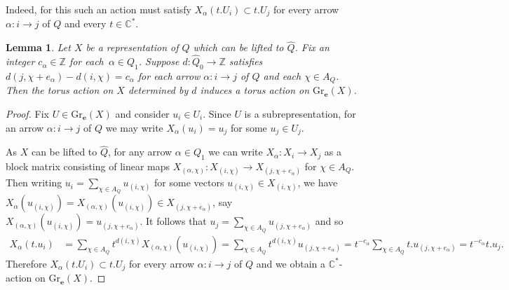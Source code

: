\documentclass{amsart}
\newtheorem{lemma}[theorem]{Lemma}
\numberwithin{equation}{section}
\newcommand{\CC}{\mathbb{C}}
\newcommand{\ZZ}{\mathbb{Z}}
\newcommand{\bfe}{\mathbf{e}}
\newcommand{\Gr}{\mathrm{Gr}}
\begin{document}
Indeed, for this such an action must satisfy $X_\alpha(t.U_i)\subset t.U_j$ for every arrow $\alpha:i\to j$ of $Q$ and every $t\in\CC^*$. 
\begin{lemma}
  Let $X$ be a representation of $Q$ which can be lifted to $\hat Q$.
  Fix an integer $c_\alpha\in\ZZ$ for each~$\alpha\in Q_1$.
  Suppose $d:\hat Q_0\to\ZZ$ satisfies $d(j,\chi+e_\alpha)-d(i,\chi)=c_\alpha$ for each arrow $\alpha:i\to j$ of $Q$ and each $\chi\in A_Q$.
  Then the torus action on $X$ determined by $d$ induces a torus action on $\Gr_\bfe(X)$.
\end{lemma}
\begin{proof} 
  Fix $U\in\Gr_\bfe(X)$ and consider $u_i\in U_i$.
  Since $U$ is a subrepresentation, for an arrow $\alpha:i\to j$ of $Q$ we may write $X_\alpha(u_i)=u_j$ for some $u_j\in U_j$.

  As $X$ can be lifted to $\hat Q$, for any arrow $\alpha\in Q_1$ we can write $X_\alpha:X_i\to X_j$ as a block matrix consisting of linear maps $X_{(\alpha,\chi)}:X_{(i,\chi)}\to X_{(j,\chi+e_\alpha)}$ for $\chi\in A_Q$.
  Then writing $u_i=\sum_{\chi\in A_Q} u_{(i,\chi)}$ for some vectors $u_{(i,\chi)}\in X_{(i,\chi)}$, we have $X_\alpha(u_{(i,\chi)})=X_{(\alpha,\chi)}(u_{(i,\chi)})\in X_{(j,\chi+e_\alpha)}$, say $X_{(\alpha,\chi)}(u_{(i,\chi)})=u_{(j,\chi+e_\alpha)}$.
  It follows that $u_j=\sum_{\chi\in A_Q} u_{(j,\chi+e_\alpha)}$ and so
  \begin{align*}
    X_\alpha(t.u_i)
    &=\sum\limits_{\chi\in A_Q} t^{d(i,\chi)}X_{(\alpha,\chi)}(u_{(i,\chi)})=\sum\limits_{\chi\in A_Q} t^{d(i,\chi)}u_{(j,\chi+e_\alpha)}=t^{-c_\alpha}\sum\limits_{\chi\in A_Q} t.u_{(j,\chi+e_\alpha)}=t^{-c_\alpha} t.u_j.
  \end{align*}
  Therefore $X_\alpha(t.U_i)\subset t.U_j$ for every arrow $\alpha:i\to j$ of $Q$ and we obtain a $\CC^*$-action on $\Gr_\bfe(X)$.
\end{proof}
\end{document}

